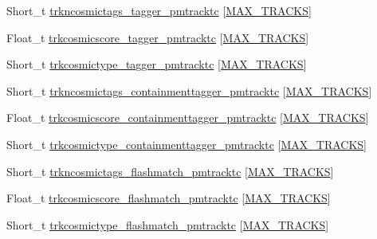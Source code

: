 \begin{DoxyCompactItemize}
\item 
Short\-\_\-t \hyperlink{classanatree_a504bc60d1d1f1403c9625a7ea8b6358b}{trkncosmictags\-\_\-tagger\-\_\-pmtracktc} \mbox{[}\hyperlink{anatree__core__v09410002_8h_a327fd4e796e4a0d78947524c96e4362e}{M\-A\-X\-\_\-\-T\-R\-A\-C\-K\-S}\mbox{]}
\item 
Float\-\_\-t \hyperlink{classanatree_a1fb10c3b5cdfe58d35cb63137d612acc}{trkcosmicscore\-\_\-tagger\-\_\-pmtracktc} \mbox{[}\hyperlink{anatree__core__v09410002_8h_a327fd4e796e4a0d78947524c96e4362e}{M\-A\-X\-\_\-\-T\-R\-A\-C\-K\-S}\mbox{]}
\item 
Short\-\_\-t \hyperlink{classanatree_a2ef4e92edce03e3bf308d76de20a66a8}{trkcosmictype\-\_\-tagger\-\_\-pmtracktc} \mbox{[}\hyperlink{anatree__core__v09410002_8h_a327fd4e796e4a0d78947524c96e4362e}{M\-A\-X\-\_\-\-T\-R\-A\-C\-K\-S}\mbox{]}
\item 
Short\-\_\-t \hyperlink{classanatree_a674aee8b1707f77ced823e4cf79ddcc5}{trkncosmictags\-\_\-containmenttagger\-\_\-pmtracktc} \mbox{[}\hyperlink{anatree__core__v09410002_8h_a327fd4e796e4a0d78947524c96e4362e}{M\-A\-X\-\_\-\-T\-R\-A\-C\-K\-S}\mbox{]}
\item 
Float\-\_\-t \hyperlink{classanatree_a86eb981b40ae60da0c439947b4a011c2}{trkcosmicscore\-\_\-containmenttagger\-\_\-pmtracktc} \mbox{[}\hyperlink{anatree__core__v09410002_8h_a327fd4e796e4a0d78947524c96e4362e}{M\-A\-X\-\_\-\-T\-R\-A\-C\-K\-S}\mbox{]}
\item 
Short\-\_\-t \hyperlink{classanatree_abc3c285943f8c1e728b1322d3a2fd6ea}{trkcosmictype\-\_\-containmenttagger\-\_\-pmtracktc} \mbox{[}\hyperlink{anatree__core__v09410002_8h_a327fd4e796e4a0d78947524c96e4362e}{M\-A\-X\-\_\-\-T\-R\-A\-C\-K\-S}\mbox{]}
\item 
Short\-\_\-t \hyperlink{classanatree_a9ae23552b9c97855a48975455d5919dd}{trkncosmictags\-\_\-flashmatch\-\_\-pmtracktc} \mbox{[}\hyperlink{anatree__core__v09410002_8h_a327fd4e796e4a0d78947524c96e4362e}{M\-A\-X\-\_\-\-T\-R\-A\-C\-K\-S}\mbox{]}
\item 
Float\-\_\-t \hyperlink{classanatree_a186931ceae13970e98a9e0c5abac3b79}{trkcosmicscore\-\_\-flashmatch\-\_\-pmtracktc} \mbox{[}\hyperlink{anatree__core__v09410002_8h_a327fd4e796e4a0d78947524c96e4362e}{M\-A\-X\-\_\-\-T\-R\-A\-C\-K\-S}\mbox{]}
\item 
Short\-\_\-t \hyperlink{classanatree_a1434a7f0ee354b1d1ab19a4e938f833f}{trkcosmictype\-\_\-flashmatch\-\_\-pmtracktc} \mbox{[}\hyperlink{anatree__core__v09410002_8h_a327fd4e796e4a0d78947524c96e4362e}{M\-A\-X\-\_\-\-T\-R\-A\-C\-K\-S}\mbox{]}

\end{DoxyCompactItemize}
